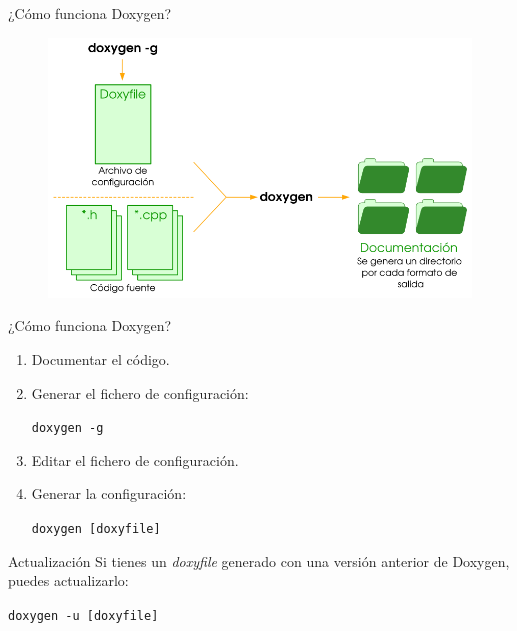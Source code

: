 \documentclass[12pt,xcolor=svgnames]{beamer}
\begin{document}
\begin{frame}{¿Cómo funciona Doxygen?}    
  \begin{cambiarmargen}{-1.2cm}{-1cm}
    \begin{figure}
      \centering
      \includegraphics[width=1.1\textwidth]{./img/funcionamiento}
    \end{figure}
  \end{cambiarmargen}
\end{frame}

\begin{frame}{¿Cómo funciona Doxygen?}
  \begin{enumerate}
  \item Documentar el código.
  \item Generar el fichero de configuración: 
    \begin{center}\texttt{doxygen -g}\end{center}
  \item Editar el fichero de configuración.
  \item Generar la configuración:
    \begin{center}\texttt{doxygen [doxyfile]}\end{center}
  \end{enumerate}

  \begin{block}{Actualización}
    Si tienes un \textit{doxyfile} generado con una versión anterior de
    Doxygen, puedes actualizarlo:
    \begin{center}\texttt{doxygen -u [doxyfile]}\end{center}
  \end{block}
\end{frame}
\end{document}
